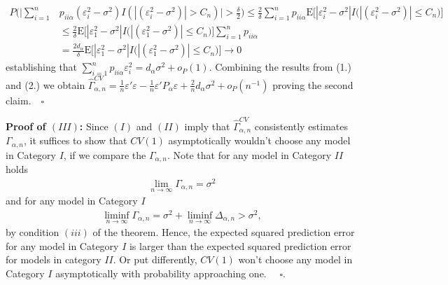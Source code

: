 \documentclass[Research_Module_ES.tex]{subfiles}
\begin{document}
\begin{align*}
P\biggl(\biggl|\sum_{i=1}^n &p_{ii\alpha}(\varepsilon_i^2-\sigma^2)I(|(\varepsilon_i^2-\sigma^2)|> C_n)\biggr|>\frac{\delta}{2}\biggr) \le \frac{2}{\delta}\sum_{i=1}^n p_{ii\alpha}\mathrm{E}\bigl[|\varepsilon_i^2-\sigma^2|I\bigl(|(\varepsilon_i^2-\sigma^2)|\le C_n\bigr)\bigr]\\
&\le  \frac{2}{\delta}\mathrm{E}\bigl[|\varepsilon_1^2-\sigma^2|I\bigl(|(\varepsilon_1^2-\sigma^2)|\le C_n\bigr)\bigr]\sum_{i=1}^n p_{ii\alpha} \\
&=  \frac{2d_\alpha}{\delta}\mathrm{E}\bigl[|\varepsilon_1^2-\sigma^2|I\bigl(|(\varepsilon_1^2-\sigma^2)|\le C_n\bigr)\bigr] \to 0
\end{align*}
establishing that $\sum_{i=1}^n p_{ii\alpha}\varepsilon_i^2= d_\alpha \sigma^2 + o_P(1)$.
Combining the results from (1.) and (2.) we obtain $\hat{\Gamma}_{\alpha,n}^{CV} =\frac{1}{n}\varepsilon'\varepsilon- \frac{1}{n}\varepsilon'P_\alpha\varepsilon + \frac{2}{n}d_\alpha\sigma^2 +o_P(n^{-1})$
proving the second claim.$\quad\square$

\textbf{Proof of $(III)$:}
Since $(I)$ and $(II)$ imply that $\hat{\Gamma}_{\alpha,n}^{CV}$ consistently estimates $\Gamma_{\alpha,n}$, it suffices to show that $CV(1)$ asymptotically wouldn't choose any model in Category $I$, if we compare the $\Gamma_{\alpha,n}$. 
Note that for any model in Category $II$ holds
\begin{align*}
\lim_{n\to \infty} \Gamma_{\alpha,n} = \sigma^2 
\end{align*}
and for any model in Category $I$
\begin{align*}
\liminf_{n\to \infty} \Gamma_{\alpha,n} = \sigma^2 + \liminf_{n \to \infty} \Delta_{\alpha,n} >  \sigma^2,
\end{align*}
by condition $(iii)$ of the theorem. Hence, the expected squared prediction error for any model in Category $I$ is larger than the expected squared prediction error for models in category $II$. Or put differently, $CV(1)$ won't choose any model in Category $I$ asymptotically with probability approaching one. $\quad\square$.
\end{document}
